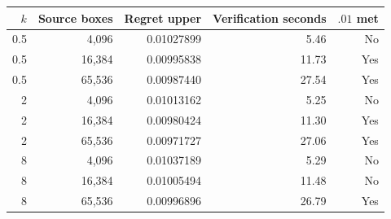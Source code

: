 \begin{tabular}{rrrrr}
\toprule
$k$ & Source boxes & Regret upper & Verification seconds & $.01$ met \\
\midrule
0.5 & 4,096 & 0.01027899 & 5.46 & No \\
0.5 & 16,384 & 0.00995838 & 11.73 & Yes \\
0.5 & 65,536 & 0.00987440 & 27.54 & Yes \\
2 & 4,096 & 0.01013162 & 5.25 & No \\
2 & 16,384 & 0.00980424 & 11.30 & Yes \\
2 & 65,536 & 0.00971727 & 27.06 & Yes \\
8 & 4,096 & 0.01037189 & 5.29 & No \\
8 & 16,384 & 0.01005494 & 11.48 & No \\
8 & 65,536 & 0.00996896 & 26.79 & Yes \\
\bottomrule
\end{tabular}
